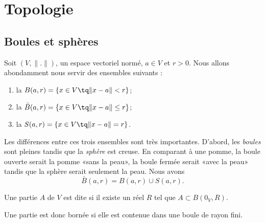 
\section{Topologie}

\subsection{Boules et sphères}

\begin{definition}
	Soit $(V,\| . \|)$, un espace vectoriel normé, $a\in V$ et $r>0$. Nous allons abondamment nous servir des ensembles suivants :
	\begin{enumerate}

		\item
		      la  $B(a,r)=\{ x\in V\tq \| x-a \|<r \}$;
		\item
		      la  $\bar B(a,r)=\{ x\in V\tq \| x-a \|\leq r \}$;
		\item
		      la  $S(a,r)=\{ x\in V\tq \| x-a \|=r \}$.

	\end{enumerate}
\end{definition}
Les différences entre ces trois ensembles sont très importantes. D'abord, les \emph{boules} sont pleines tandis que la \emph{sphère} est creuse. En comparant à une pomme, la boule ouverte serait la pomme «sans la peau», la boule fermée serait «avec la peau» tandis que la sphère serait seulement la peau. Nous avons
\begin{equation}
	\bar B(a,r)=B(a,r)\cup S(a,r).
\end{equation}

\begin{definition}
	Une partie $A$ de $V$ est dite  si il existe un réel $R$ tel que $A\subset B(0_V,R)$.
\end{definition}
Une partie est donc bornée si elle est contenue dans une boule de rayon fini.

